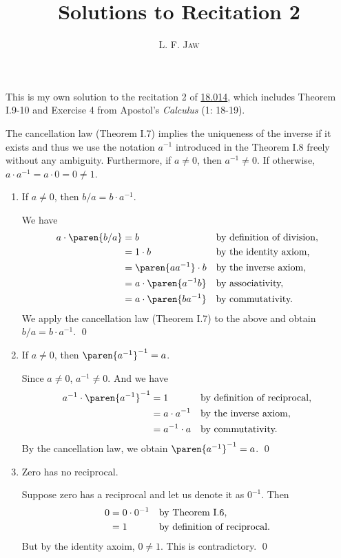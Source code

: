 \documentclass[a4paper]{article}
\title{Solutions to Recitation 2}
\author{L. F. \textsc{Jaw}}
\begin{document}
\maketitle

This is my own solution to the recitation 2 of
\href{https://ocw.mit.edu/courses/mathematics/18-014-calculus-with-theory-fall-2010/recitations/}{18.014},
which includes Theorem I.9-10 and Exercise 4 from Apostol's
\emph{Calculus} (1: 18-19).

\pskip

The cancellation law (Theorem I.7) implies the uniqueness of the
inverse if it exists and thus we use the notation \(a^{-1}\)
introduced in the Theorem I.8 freely without any ambiguity.
Furthermore, if \(a \ne 0\), then \(a^{-1} \ne 0\).  If otherwise,
\(a \cdot a^{-1} = a \cdot 0 = 0 \ne 1\).

\begin{enumerate}
\item If \(a \ne 0\), then \(b/a = b \cdot a^{-1}\).

  We have
  \begin{align*}
    a \cdot \paren{b/a}
    &= b                        && \reason{by definition of division,} \\
    &= 1 \cdot b                && \reason{by the identity axiom,}\\
    &= \paren{aa^{-1}} \cdot b  && \reason{by the inverse axiom,} \\
    &= a \cdot \paren{a^{-1} b} && \reason{by associativity,} \\
    &= a \cdot \paren{ba^{-1}}  && \reason{by commutativity.}
  \end{align*}
  We apply the cancellation law (Theorem I.7) to the above and obtain
  \(b/a = b \cdot a^{-1}\).  \qed

\item If \(a \ne 0\), then \(\paren{a^{-1}}^{-1} = a\).

  Since \(a \ne 0\), \(a^{-1} \ne 0\).  And we have
  \begin{align*}
    a^{-1} \cdot \paren{a^{-1}}^{-1}
    &= 1              && \reason{by definition of reciprocal,} \\
    &= a \cdot a^{-1} && \reason{by the inverse axiom,} \\
    &= a^{-1} \cdot a && \reason{by commutativity.}
  \end{align*}
  By the cancellation law, we obtain \(\paren{a^{-1}}^{-1} = a\).  \qed

\item Zero has no reciprocal.

  Suppose zero has a reciprocal and let us denote it as \(0^{-1}\).  Then
  \begin{align*}
    0 &= 0 \cdot 0^{-1} && \text{by Theorem I.6,} \\
      &= 1              && \text{by definition of reciprocal.}
  \end{align*}
  But by the identity axoim, \(0 \ne 1\).  This is contradictory.  \qed
\end{enumerate}
\end{document}
